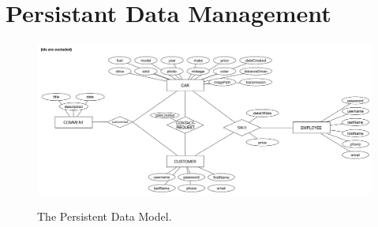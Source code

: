 \section{Persistant Data Management}
\begin{figure}[h!]
	\centering
		\includegraphics[scale=0.30]{Figures/PersistentDataModel}\\
	\caption{The Persistent Data Model.}
\end{figure}